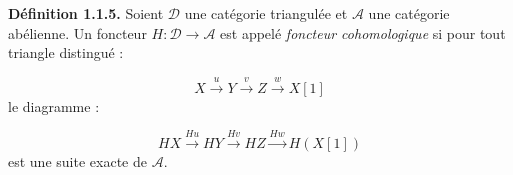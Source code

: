 \medskip
\noindent\textbf{Définition 1.1.5.}\quad
Soient $\mathcal D$ une catégorie triangulée et $\mathcal A$ une catégorie
abélienne. Un foncteur $H\colon\mathcal D\longrightarrow\mathcal A$ est
appelé \emph{foncteur cohomologique} si pour tout triangle distingué :

\[
  X\xrightarrow{u}Y\xrightarrow{v}Z\xrightarrow{w}X[1]
\]
le diagramme :

\[
  HX\xrightarrow{Hu}HY\xrightarrow{Hv}HZ\xrightarrow{Hw}H(X[1])
\]
est une suite exacte de $\mathcal A$.
\endgroup
